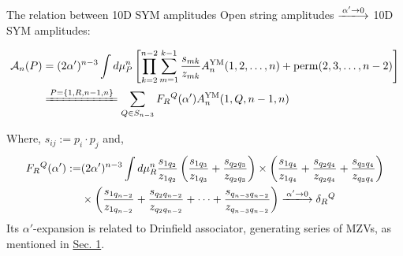\documentclass{beamer}
\begin{document}
\begin{frame}{The relation between 10D SYM amplitudes}
	Open string amplitudes $\xlongrightarrow{\alpha'\to 0}$ 10D SYM amplitudes:
	\begin{small}
		\begin{equation*}
			\begin{aligned}
				\mathcal{A}_n(P)&=(2\alpha^{\prime})^{n-3}\int d\mu_P^n\left[\prod_{k=2}^{n-2}\sum_{m=1}^{k-1}\frac{s_{mk}}{z_{mk}}A^{\text{YM}}_n(1,2,\ldots,n)+\mathrm{perm}(2,3,\ldots,n-2)\right]\\
				&\xlongequal{P=\{1,R,n-1,n\}} \sum_{Q\in S_{n-3}}F_R{}^Q(\alpha^{\prime})A^{\text{YM}}_n(1,Q,n-1,n)
			\end{aligned}
		\end{equation*}
	\end{small}
	Where, $s_{ij}:=p_i\cdot p_j$ and,
	\begin{equation*}
		\begin{aligned}
			F_{R}{}^{Q}(\alpha^{\prime}):=&(2\alpha^{\prime})^{n-3}\int d\mu_{R}^{n}\frac{s_{1q_{2}}}{z_{1q_{2}}}\left(\frac{s_{1q_{3}}}{z_{1q_{3}}}+\frac{s_{q_{2}q_{3}}}{z_{q_{2}q_{3}}}\right)\times\left(\frac{s_{1q_{4}}}{z_{1q_{4}}}+\frac{s_{q_{2}q_{4}}}{z_{q_{2}q_{4}}}+\frac{s_{q_{3}q_{4}}}{z_{q_{3}q_{4}}}\right)\\&\times\left(\frac{s_{1q_{n-2}}}{z_{1q_{n-2}}}+\frac{s_{q_{2}q_{n-2}}}{z_{q_{2}q_{n-2}}}+\cdots+\frac{s_{q_{n-3}q_{n-2}}}{z_{q_{n-3}q_{n-2}}}\right)\xlongrightarrow{\alpha'\to 0}\delta_{R}{}^{Q}
		\end{aligned}
	\end{equation*}
	Its $\alpha'$-expansion is related to {\color{WHU} Drinfield associator}, generating series of MZVs, as mentioned in \hyperlink{drinfield}{\color{blue}Sec. 1}.
\end{frame}
\end{document}
